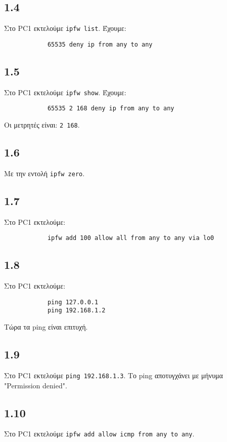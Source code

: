 \documentclass[a4paper, 12pt]{article}
\begin{document}
	\subsection*{1.4}
		Στο PC1 εκτελούμε \verb|ipfw list|. Έχουμε:
		
		\begin{verbatim}
			65535 deny ip from any to any
		\end{verbatim}

	\subsection*{1.5}
		Στο PC1 εκτελούμε \verb|ipfw show|. Έχουμε:
		
		\begin{verbatim}
			65535 2 168 deny ip from any to any
		\end{verbatim}
		
		Οι μετρητές είναι: \verb|2 168|.

	\subsection*{1.6}
		Με την εντολή \verb|ipfw zero|.

	\subsection*{1.7}
		Στο PC1 εκτελούμε: 
		
		\begin{verbatim}
			ipfw add 100 allow all from any to any via lo0
		\end{verbatim}

	\subsection*{1.8}
		Στο PC1 εκτελούμε:
		
		\begin{verbatim}
			ping 127.0.0.1
			ping 192.168.1.2
		\end{verbatim}

		Τώρα τα ping είναι επιτυχή.

	\subsection*{1.9}
		Στο PC1 εκτελούμε \verb|ping 192.168.1.3|. Το ping αποτυγχάνει με μήνυμα "Permission denied".
	
	\subsection*{1.10}
		Στο PC1 εκτελούμε \verb|ipfw add allow icmp from any to any|.
\end{document}
